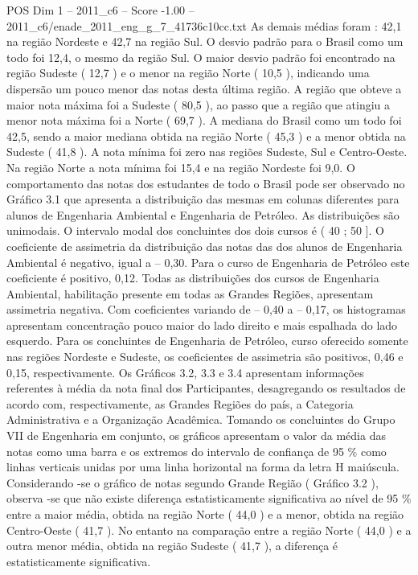 \begin{textsample}{POS Dim 1 – 2011\_c6 – Score -1.00 – 2011\_c6/enade\_2011\_eng\_g\_7\_41736c10cc.txt}
As demais médias foram : 42,1 na região Nordeste e 42,7 na região Sul.
O desvio padrão para o Brasil como um todo foi 12,4, o mesmo da região Sul.
O maior desvio padrão foi encontrado na região Sudeste ( 12,7 ) e o menor na região Norte ( 10,5 ), indicando uma dispersão um pouco menor das notas desta última região.
A região que obteve a maior nota máxima foi a Sudeste ( 80,5 ), ao passo que a região que atingiu a menor nota máxima foi a Norte ( 69,7 ).
A mediana do Brasil como um todo foi 42,5, sendo a maior mediana obtida na região Norte ( 45,3 ) e a menor obtida na Sudeste ( 41,8 ).
A nota mínima foi zero nas regiões Sudeste, Sul e Centro-Oeste.
Na região Norte a nota mínima foi 15,4 e na região Nordeste foi 9,0.
O comportamento das notas dos estudantes de todo o Brasil pode ser observado no Gráfico 3.1 que apresenta a distribuição das mesmas em colunas diferentes para alunos de Engenharia Ambiental e Engenharia de Petróleo.
As distribuições são unimodais.
O intervalo modal dos concluintes dos dois cursos é ( 40 ; 50 ].
O coeficiente de assimetria da distribuição das notas das dos alunos de Engenharia Ambiental é negativo, igual a – 0,30.
Para o curso de Engenharia de Petróleo este coeficiente é positivo, 0,12.
Todas as distribuições dos cursos de Engenharia Ambiental, habilitação presente em todas as Grandes Regiões, apresentam assimetria negativa.
Com coeficientes variando de – 0,40 a – 0,17, os histogramas apresentam concentração pouco maior do lado direito e mais espalhada do lado esquerdo.
Para os concluintes de Engenharia de Petróleo, curso oferecido somente nas regiões Nordeste e Sudeste, os coeficientes de assimetria são positivos, 0,46 e 0,15, respectivamente.
Os Gráficos 3.2, 3.3 e 3.4 apresentam informações referentes à média da nota final dos Participantes, desagregando os resultados de acordo com, respectivamente, as Grandes Regiões do país, a Categoria Administrativa e a Organização Acadêmica.
Tomando os concluintes do Grupo VII de Engenharia em conjunto, os gráficos apresentam o valor da média das notas como uma barra e os extremos do intervalo de confiança de 95 \% como linhas verticais unidas por uma linha horizontal na forma da letra H maiúscula.
Considerando -se o gráfico de notas segundo Grande Região ( Gráfico 3.2 ), observa -se que não existe diferença estatisticamente significativa ao nível de 95 \% entre a maior média, obtida na região Norte ( 44,0 ) e a menor, obtida na região Centro-Oeste ( 41,7 ).
No entanto na comparação entre a região Norte ( 44,0 ) e a outra menor média, obtida na região Sudeste ( 41,7 ), a diferença é estatisticamente significativa.

\end{textsample}
